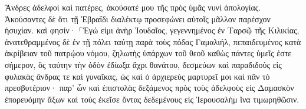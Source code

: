 \documentclass{openreader}
\begin{document}
Ἄνδρες ἀδελφοὶ καὶ πατέρες, ἀκούσατέ μου τῆς πρὸς ὑμᾶς νυνὶ ἀπολογίας. 
Ἀκούσαντες δὲ ὅτι τῇ Ἑβραΐδι διαλέκτῳ προσεφώνει αὐτοῖς μᾶλλον παρέσχον ἡσυχίαν. καὶ φησίν· 
⸀Ἐγώ εἰμι ἀνὴρ Ἰουδαῖος, γεγεννημένος ἐν Ταρσῷ τῆς Κιλικίας, ἀνατεθραμμένος δὲ ἐν τῇ πόλει ταύτῃ παρὰ τοὺς πόδας Γαμαλιήλ, πεπαιδευμένος κατὰ ἀκρίβειαν τοῦ πατρῴου νόμου, ζηλωτὴς ὑπάρχων τοῦ θεοῦ καθὼς πάντες ὑμεῖς ἐστε σήμερον, 
ὃς ταύτην τὴν ὁδὸν ἐδίωξα ἄχρι θανάτου, δεσμεύων καὶ παραδιδοὺς εἰς φυλακὰς ἄνδρας τε καὶ γυναῖκας, 
ὡς καὶ ὁ ἀρχιερεὺς μαρτυρεῖ μοι καὶ πᾶν τὸ πρεσβυτέριον· παρ’ ὧν καὶ ἐπιστολὰς δεξάμενος πρὸς τοὺς ἀδελφοὺς εἰς Δαμασκὸν ἐπορευόμην ἄξων καὶ τοὺς ἐκεῖσε ὄντας δεδεμένους εἰς Ἰερουσαλὴμ ἵνα τιμωρηθῶσιν. 
\end{document}
